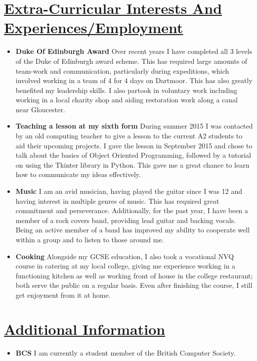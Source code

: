 \documentclass[11pt]{article}
\begin{document}
	\vspace{-20pt}
	\hspace{-100pt}\section*{\underline{Extra-Curricular Interests And Experiences/Employment}}
			\begin{itemize}
				\item \textbf{Duke Of Edinburgh Award} Over recent years I have completed all 3 levels of the Duke of Edinburgh award scheme. This has required large amounts of team-work and communication, particularly during expeditions, which involved working in a team of 4 for 4 days on Dartmoor. This has also greatly benefited my leadership skills. I also partook in voluntary work including working in a local charity shop and aiding restoration work along a canal near Gloucester.
				\item \textbf{Teaching a lesson at my sixth form} During summer 2015 I was contacted by an old computing teacher to give a lesson to the current A2 students to aid their upcoming projects. I gave the lesson in September 2015 and chose to talk about the basics of Object Oriented Programming, followed by a tutorial on using the Tkinter library in Python. This gave me a great chance to learn how to communicate my ideas effectively. 
				\item \textbf{Music} I am an avid musician, having played the guitar since I was 12 and having interest in multiple genres of music. This has required great commitment and perseverance. Additionally, for the past year, I have been a member of a rock covers band, providing lead guitar and backing vocals. Being an active member of a band has improved my ability to cooperate well within a group and to listen to those around me. 
				\item \textbf{Cooking} Alongside my GCSE education, I also took a vocational NVQ course in catering at my local college, giving me experience working in a functioning kitchen as well as working front of house in the college restaurant; both serve the public on a regular basis. Even after finishing the course, I still get enjoyment from it at home.
			\end{itemize}

	\vspace{-20pt}
	\hspace{-100pt}\section*{\underline{Additional Information}}
		\begin{itemize}
			\item \textbf{BCS} I am currently a student member of the British Computer Society.
		\end{itemize}
\end{document}
